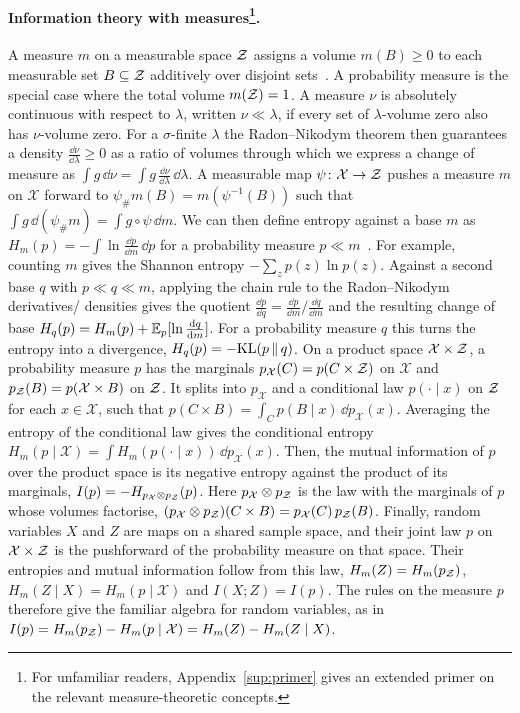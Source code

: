\paragraph[Information theory with measures]{Information theory with measures\footnote{For unfamiliar readers, Appendix~\ref{sup:primer} gives an extended primer on the relevant measure-theoretic concepts.}.}
A measure $m$ on a measurable space $\mathcal Z$ assigns a volume $m(B) \ge 0$ to each measurable set $B \subseteq \mathcal Z$ additively over disjoint sets~\citep{Billingsley-probability12}.
A probability measure is the special case where the total volume $m(\mathcal Z) = 1$.
A measure $\nu$ is absolutely continuous with respect to $\lambda$, written $\nu \ll \lambda$, if every set of $\lambda$-volume zero also has $\nu$-volume zero.
For a $\sigma$-finite $\lambda$ the Radon--Nikodym theorem then guarantees a density $\tfrac{\dd\nu}{\dd\lambda} \ge 0$ as a ratio of volumes through which we express a change of measure as $\int g\,\dd\nu = \int g\,\tfrac{\dd\nu}{\dd\lambda}\,\dd\lambda$.
A measurable map $\psi\colon \mathcal X \to \mathcal Z$ pushes a measure $m$ on $\mathcal X$ forward to $\psi_\# m(B) = m(\psi^{-1}(B))$ such that $\int g\,\dd(\psi_\# m) = \int g \circ \psi\,\dd m$.
We can then define entropy against a base $m$ as $H_m(p) = -\int \ln \tfrac{\dd p}{\dd m}\,\dd p$ for a probability measure $p \ll m$~\citep{Cover-elements06,Gray-entropy11}.
For example, counting $m$ gives the Shannon entropy $-\sum_z p(z) \ln p(z)$.
Against a second base $q$ with $p \ll q \ll m$, applying the chain rule to the Radon--Nikodym derivatives/ densities gives the quotient $\tfrac{\dd p}{\dd q} = \tfrac{\dd p}{\dd m} / \tfrac{\dd q}{\dd m}$ and the resulting change of base $H_q(p) = H_m(p) + \mathbb E_p[\ln \tfrac{\mathrm d q}{\mathrm d m}]$.
For a probability measure $q$ this turns the entropy into a divergence, $H_q(p) = -\mathrm{KL}(p \,\|\, q)$.
On a product space $\mathcal X \times \mathcal Z$, a probability measure $p$ has the marginals $p_{\mathcal X}(C) = p(C \times \mathcal Z)$ on $\mathcal X$ and $p_{\mathcal Z}(B) = p(\mathcal X \times B)$ on $\mathcal Z$.
It splits into $p_{\mathcal X}$ and a conditional law $p(\cdot \mid x)$ on $\mathcal Z$ for each $x \in \mathcal X$, such that $p(C \times B) = \int_C p(B \mid x)\,\dd p_{\mathcal X}(x)$.
Averaging the entropy of the conditional law gives the conditional entropy $H_m(p \mid \mathcal X) = \int H_m(p(\cdot \mid x))\,\dd p_{\mathcal X}(x)$.
Then, the mutual information of $p$ over the product space is its negative entropy against the product of its marginals, $I(p) = -H_{p_{\mathcal X} \otimes p_{\mathcal Z}}(p)$.
Here $p_{\mathcal X} \otimes p_{\mathcal Z}$ is the law with the marginals of $p$ whose volumes factorise, $(p_{\mathcal X} \otimes p_{\mathcal Z})(C \times B) = p_{\mathcal X}(C)\,p_{\mathcal Z}(B)$.
Finally, random variables $X$ and $Z$ are maps on a shared sample space, and their joint law $p$ on $\mathcal X \times \mathcal Z$ is the pushforward of the probability measure on that space.
Their entropies and mutual information follow from this law, $H_m(Z) = H_m(p_{\mathcal Z})$, $H_m(Z \mid X) = H_m(p \mid \mathcal X)$ and $I(X;Z) = I(p)$.
The rules on the measure $p$ therefore give the familiar algebra for random variables, as in $I(p) = H_m(p_{\mathcal Z}) - H_m(p \mid \mathcal X) = H_m(Z) - H_m(Z \mid X)$.



